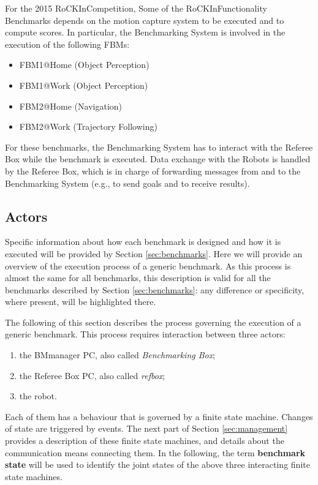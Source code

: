 \documentclass[a4paper]{article}
\newcommand{\ro}{RoCKIn}
\begin{document}
For the 2015 \ro Competition, Some of the \ro Functionality Benchmarks depends on the motion capture system to be executed and to compute scores.
In particular, the Benchmarking System is involved in the execution of the following FBMs:

\begin{itemize}
  \item FBM1@Home (Object Perception)
  \item FBM1@Work (Object Perception)
  \item FBM2@Home (Navigation)
  \item FBM2@Work (Trajectory Following)
\end{itemize}

For these benchmarks, the Benchmarking System has to interact with the Referee Box while the benchmark is executed.
Data exchange with the Robots is handled by the Referee Box, which is in charge of forwarding messages from and to the Benchmarking System (e.g., to send goals and to receive results).


\subsection{Actors}
\label{sec:actors}

Specific information about how each benchmark is designed and how it is executed will be provided by Section \ref{sec:benchmarks}. Here we will provide an overview of the execution process of a generic benchmark. As this process is almost the same for all benchmarks, this description is valid for all the benchmarks described by Section \ref{sec:benchmarks}: any difference or specificity, where present, will be highlighted there.

The following of this section describes the process governing the execution of a generic benchmark. This process requires interaction between three actors:
\begin{enumerate}
\item the BMmanager PC, also called \textit{Benchmarking Box};
\item the Referee Box PC, also called \textit{refbox};
\item the robot.
\end{enumerate}
Each of them has a behaviour that is governed by a finite state machine. Changes of state are triggered by events.
The next part of Section \ref{sec:management} provides a description of these finite state machines, and details about the communication means connecting them. In the following, the term \textbf{benchmark state} will be used to identify the joint states of the above three interacting finite state machines.
\end{document}

